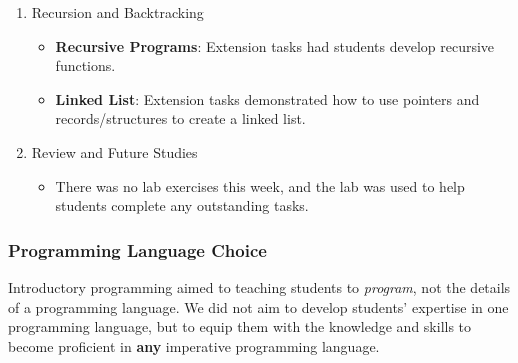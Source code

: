 \begin{enumerate}
  \item Recursion and Backtracking
  \begin{itemize}[noitemsep,nolistsep]
  	\item \textbf{Recursive Programs}: Extension tasks had students develop recursive functions.
  	\item \textbf{Linked List}: Extension tasks demonstrated how to use pointers and records/structures to create a linked list.
  \end{itemize}

  \item Review and Future Studies
  \begin{itemize}[noitemsep,nolistsep]
  	\item There was no lab exercises this week, and the lab was used to help students complete any outstanding tasks.
  \end{itemize}
\end{enumerate}


\subsubsection{Programming Language Choice} %
\label{ssub:programming_language_choice}

Introductory programming aimed to teaching students to \emph{program}, not the details of a programming language. We did not aim to develop students' expertise in one programming language, but to equip them with the knowledge and skills to become proficient in \textbf{any} imperative programming language.

